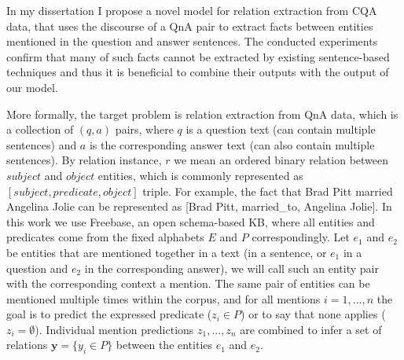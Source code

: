 In my dissertation I propose a novel model for relation extraction from CQA data, that uses the discourse of a QnA pair to extract facts between entities mentioned in the question and answer sentences.
The conducted experiments confirm that many of such facts cannot be extracted by existing sentence-based techniques and thus it is beneficial to combine their outputs with the output of our model.

More formally, the target problem is relation extraction from QnA data, which is a collection of $(q, a)$ pairs, where $q$ is a question text (can contain multiple sentences) and $a$ is the corresponding answer text (can also contain multiple sentences).
By relation instance, $r$ we mean an ordered binary relation between $subject$ and $object$ entities, which is commonly represented as $[subject, predicate, object]$ triple.
For example, the fact that Brad Pitt married Angelina Jolie can be represented as [Brad Pitt, married\_to, Angelina Jolie].
In this work we use Freebase, an open schema-based KB, where all entities and predicates come from the fixed alphabets $E$ and $P$ correspondingly.
Let $e_1$ and $e_2$ be entities that are mentioned together in a text (\eg in a sentence, or $e_1$ in a question and $e_2$ in the corresponding answer), we will call such an entity pair with the corresponding context a mention.
The same pair of entities can be mentioned multiple times within the corpus, and for all mentions $i=1,...,n$ the goal is to predict the expressed predicate ($z_i \in P$) or to say that none applies ($z_i = \emptyset$).
Individual mention predictions $z_1, ..., z_n$ are combined to infer a set of relations $\mathbf{y}=\{y_i \in P\}$ between the entities $e_1$ and $e_2$.

